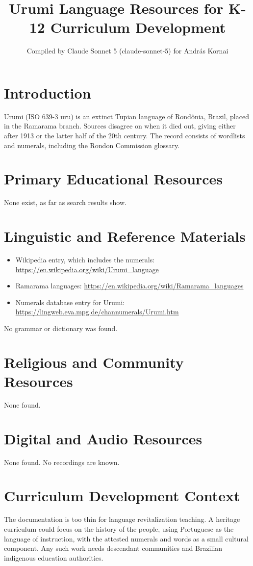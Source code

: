 \documentclass[12pt]{article}
\title{Urumi Language Resources for K-12 Curriculum Development}
\author{Compiled by Claude Sonnet 5 (claude-sonnet-5) for Andr\'as Kornai}
\date{}
\begin{document}
\maketitle

\section{Introduction}
Urumi (ISO 639-3 uru) is an extinct Tupian language of Rond\^onia, Brazil, placed in the Ramarama branch. Sources disagree on when it died out, giving either after 1913 or the latter half of the 20th century. The record consists of wordlists and numerals, including the Rondon Commission glossary.

\section{Primary Educational Resources}
None exist, as far as search results show.

\section{Linguistic and Reference Materials}
\begin{itemize}
\item Wikipedia entry, which includes the numerals: \url{https://en.wikipedia.org/wiki/Urumi_language}
\item Ramarama languages: \url{https://en.wikipedia.org/wiki/Ramarama_languages}
\item Numerals database entry for Urumi: \url{https://lingweb.eva.mpg.de/channumerals/Urumi.htm}
\end{itemize}
No grammar or dictionary was found.

\section{Religious and Community Resources}
None found.

\section{Digital and Audio Resources}
None found. No recordings are known.

\section{Curriculum Development Context}
The documentation is too thin for language revitalization teaching. A heritage curriculum could focus on the history of the people, using Portuguese as the language of instruction, with the attested numerals and words as a small cultural component. Any such work needs descendant communities and Brazilian indigenous education authorities.
\end{document}
